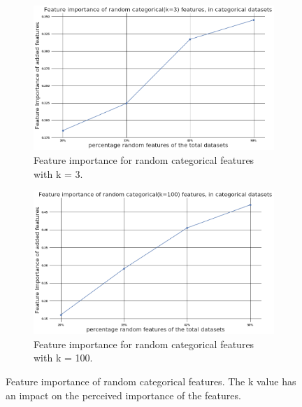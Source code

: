 \documentclass[a4paper,10pt]{article}
\begin{document}
\begin{figure}[H]
	\centering
	\begin{subfigure}[b]{0.45\textwidth}
		\includegraphics[width=\textwidth]{images/MetaFeatures/FeatureImportanceCatK3.png}
		\caption{Feature importance for random categorical features with k = 3.}
		\label{fig:FIC3}
	\end{subfigure}
	\begin{subfigure}[b]{0.45\textwidth}
		\includegraphics[width=\textwidth]{images/MetaFeatures/FeatureImportanceCatK100.png}
		\caption{Feature importance for random categorical features with k = 100.}
		\label{fig:FIC100}
	\end{subfigure}
	\caption{Feature importance of random categorical features. The k value has an impact on the perceived importance of the features.}\label{fig:FIC}
\end{figure}
\end{document}
